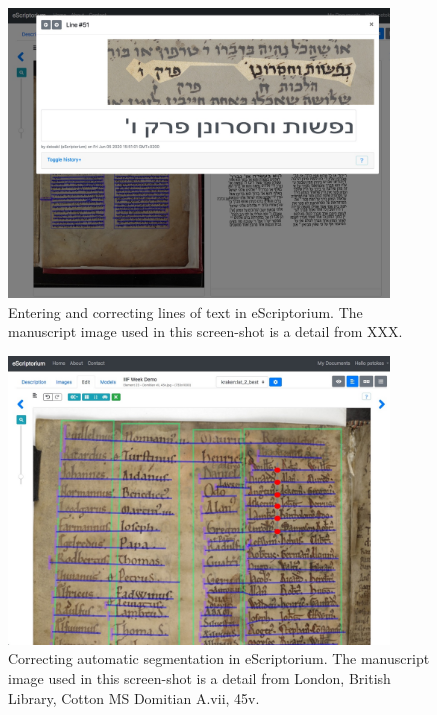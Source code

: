 \begin{figure}[h]
	\centering
	\includegraphics[width=0.9\textwidth]{fig1.jpg}
	\caption{Entering and correcting lines of text in eScriptorium. The
	manuscript image used in this screen-shot is a detail from XXX.}
	\label{fig:fig1}
\end{figure}

\begin{figure}[h]
	\centering
	\includegraphics[width=0.9\textwidth]{fig2.jpg}
	\caption{Correcting automatic segmentation in eScriptorium. The
	manuscript image used in this screen-shot is a detail from London,
	British Library, Cotton MS Domitian A.vii, 45v. }
	\label{fig:fig2}
\end{figure}

